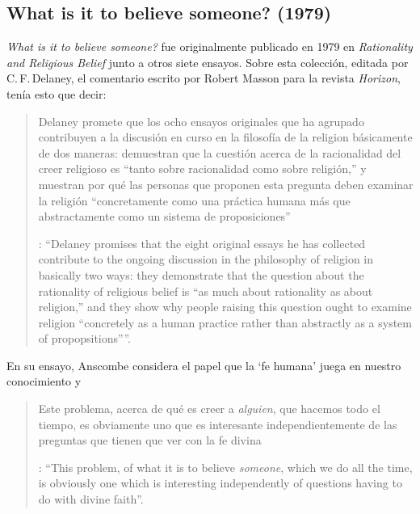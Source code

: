 \subsection{What is it to believe someone? (1979)}

\emph{What is it to believe someone?} fue originalmente publicado en 1979 en \emph{Rationality and Religious Belief} junto a otros siete ensayos. Sobre esta colección, editada por C.\,F.\,Delaney, el comentario escrito por Robert Masson para la revista \emph{Horizon}, tenía esto que decir: \blockquote[{\Cite[440]{masson1981}}: \enquote{Delaney promises that the eight original essays he has collected \textelp{} contribute to the ongoing discussion in the philosophy of religion in basically two ways: they demonstrate that the question about the rationality of religious belief is ``as much about rationality as about religion,'' and they show why people raising this question ought to examine religion ``concretely as a human practice rather than abstractly as a system of propopsitions''}.]{Delaney promete que los ocho ensayos originales que ha agrupado \textelp{} contribuyen a la discusión en curso en la filosofía de la religion básicamente de dos maneras: demuestran que la cuestión acerca de la racionalidad del creer religioso es ``tanto sobre racionalidad como sobre religión,'' y muestran por qué las personas que proponen esta pregunta deben examinar la religión ``concretamente como una práctica humana más que abstractamente como un sistema de proposiciones''}. En su ensayo, Anscombe considera el papel que la `fe humana' juega en nuestro conocimiento y \blockquote[{\Cite[xvii]{anscombe2008faith}}: \enquote{This problem, of what it is to believe \emph{someone}, which we do all the time, is obviously one which is interesting independently of questions having to do with divine faith}.]{Este problema, acerca de qué es creer a \emph{alguien}, que hacemos todo el tiempo, es obviamente uno que es interesante independientemente de las preguntas que tienen que ver con la fe divina}.

